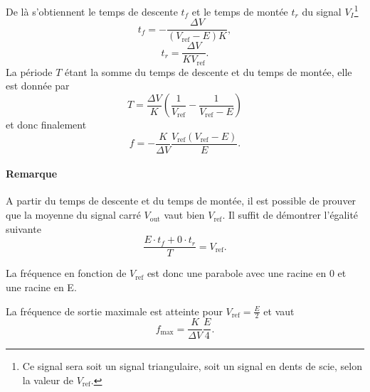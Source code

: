 De là s'obtiennent le temps de descente $t_f$ et le temps de montée $t_r$
du signal $V_I$\footnote{Ce signal sera soit un signal triangulaire,
soit un signal en dents de scie, selon la valeur de $V_{\text{ref}}$.}
\[ t_f = -\frac{\Delta V}{(V_{\text{ref}} - E)K},\]
\[ t_r = \frac{\Delta V}{KV_{\text{ref}}}.\]
La période $T$ étant la somme du temps de descente et du temps
de montée, elle est donnée par
\[ T = \frac{\Delta V}{K}\left(\frac{1}{V_{\text{ref}}} - \frac{1}{V_{\text{ref}} - E}\right) \]
et donc finalement
\begin{equation} 
	f = -\frac{K}{\Delta V} \frac{V_{\text{ref}}(V_{\text{ref}}-E)}{E}.
	\label{eq:sigma-delta-frequency}
\end{equation}

\paragraph{Remarque}
A partir du temps de descente et du temps de montée, il est possible
de prouver que la moyenne du signal carré $V_{\text{out}}$
vaut bien $V_{\text{ref}}$. Il suffit de démontrer l'égalité
suivante
\[ \frac{E \cdot t_f + 0 \cdot t_r}{T} = V_{\text{ref}}.\]

La fréquence en fonction de $V_{\text{ref}}$ est donc
une parabole avec une racine en \unit{0}{\volt} et une
racine en \unit{E}{\volt}.

La fréquence de sortie maximale est atteinte pour 
$V_{\text{ref}} = \frac{E}{2}$ et vaut
\[ f_{\text{max}} = \frac{K}{\Delta V}\frac{E}{4}. \]

